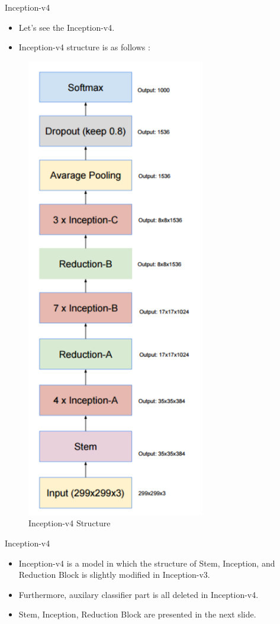 \documentclass{beamer}
\begin{document}
\begin{frame}{Inception-v4}
	\begin{itemize}
		\item Let's see the Inception-v4.
		\item Inception-v4 structure is as follows :
	\end{itemize}
	\vspace{7pt}
	\begin{figure}[h]		
		\centering
		\includegraphics[scale=0.37]{./v4/inception_v4.PNG}
		\caption{Inception-v4 Structure}
		\label{inceptionv4}
	\end{figure}
\end{frame}


\begin{frame}{Inception-v4}
	\begin{itemize}
		\item Inception-v4 is a model in which the structure of Stem, Inception, and Reduction Block is slightly modified in Inception-v3.
		\item Furthermore, auxilary classifier part is all deleted in Inception-v4.
		\item Stem, Inception, Reduction Block are presented in the next slide.
	\end{itemize}
\end{frame}
\end{document}
